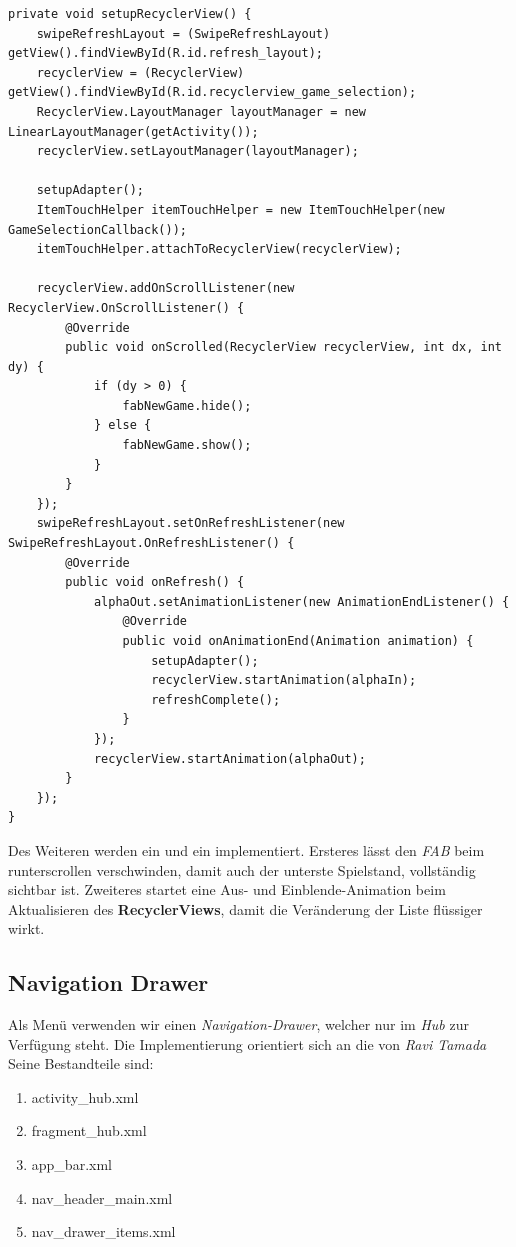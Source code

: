 \begin{lstlisting}[caption={Spielehub setupRecyclerView() Methode},captionpos=b]
private void setupRecyclerView() {
	swipeRefreshLayout = (SwipeRefreshLayout) getView().findViewById(R.id.refresh_layout);
	recyclerView = (RecyclerView) getView().findViewById(R.id.recyclerview_game_selection);
	RecyclerView.LayoutManager layoutManager = new LinearLayoutManager(getActivity());
	recyclerView.setLayoutManager(layoutManager);

	setupAdapter();
	ItemTouchHelper itemTouchHelper = new ItemTouchHelper(new GameSelectionCallback());
	itemTouchHelper.attachToRecyclerView(recyclerView);

	recyclerView.addOnScrollListener(new RecyclerView.OnScrollListener() {
		@Override
		public void onScrolled(RecyclerView recyclerView, int dx, int dy) {
			if (dy > 0) {
				fabNewGame.hide();
			} else {
				fabNewGame.show();
			}
		}
	});
	swipeRefreshLayout.setOnRefreshListener(new SwipeRefreshLayout.OnRefreshListener() {
		@Override
		public void onRefresh() {
			alphaOut.setAnimationListener(new AnimationEndListener() {
				@Override
				public void onAnimationEnd(Animation animation) {
					setupAdapter();
					recyclerView.startAnimation(alphaIn);
					refreshComplete();
				}
			});
			recyclerView.startAnimation(alphaOut);
		}
	});
}
\end{lstlisting}

Des Weiteren werden ein  und ein
 implementiert. Ersteres lässt den \emph{FAB}
beim runterscrollen verschwinden, damit auch der unterste Spielstand,
vollständig sichtbar ist. Zweiteres startet eine Aus- und Einblende-Animation
beim Aktualisieren des \textbf{RecyclerViews}, damit die Veränderung der Liste
flüssiger wirkt.

\subsection{Navigation Drawer}

Als Menü verwenden wir einen \emph{Navigation-Drawer}, welcher nur im \emph{Hub}
zur Verfügung steht. Die Implementierung orientiert sich an die von
\emph{Ravi Tamada}\cite{Tamada2013} Seine Bestandteile sind:
\begin{enumerate}
\item activity\_hub.xml
\item fragment\_hub.xml
\item app\_bar.xml
\item nav\_header\_main.xml
\item nav\_drawer\_items.xml
\end{enumerate}

